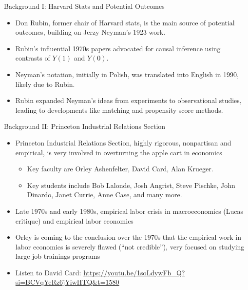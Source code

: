 \documentclass{beamer}
\begin{document}
\begin{frame}{Background I: Harvard Stats and Potential Outcomes}
  \begin{itemize}
    \item Don Rubin, former chair of Harvard stats, is the main source of potential outcomes, building on Jerzy Neyman's 1923 work.
    \item Rubin's influential 1970s papers advocated for causal inference using contrasts of $Y(1)$ and $Y(0)$.
    \item Neyman's notation, initially in Polish, was translated into English in 1990, likely due to Rubin.
    \item Rubin expanded Neyman's ideas from experiments to observational studies, leading to developments like matching and propensity score methods.
  \end{itemize}
\end{frame}


\begin{frame}{Background II: Princeton Industrial Relations Section}
  \begin{itemize}
    \item Princeton Industrial Relations Section, highly rigorous, nonpartisan and empirical, is very involved in overturning the apple cart in economics
    	\begin{itemize}
	    \item Key faculty are Orley Ashenfelter, David Card, Alan Krueger.
	    \item Key students include Bob Lalonde, Josh Angrist, Steve Pischke, John Dinardo, Janet Currie, Anne Case, and many more.
    	\end{itemize}
    \item Late 1970s and early 1980s, empirical labor crisis in macroeconomics (Lucas critique) and empirical labor economics
    \item Orley is coming to the conclusion over the 1970s that the empirical work in labor economics is severely flawed (``not credible''), very focused on studying large job trainings programs
    \item Listen to David Card: \url{https://youtu.be/1soLdywFb_Q?si=BCVqYeRz6jYiwHTQ&t=1580}
  \end{itemize}
\end{frame}
\end{document}

